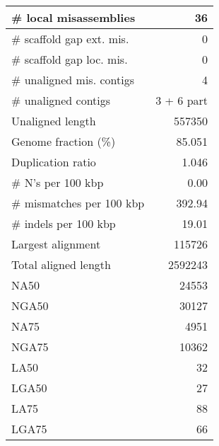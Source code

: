 \documentclass[12pt,a4paper]{article}
\begin{document}
\begin{table}[ht]
\begin{center}
\begin{tabular}{|l*{1}{|r}|}
\# local misassemblies & 36 \\ \hline
\# scaffold gap ext. mis. & 0 \\ \hline
\# scaffold gap loc. mis. & 0 \\ \hline
\# unaligned mis. contigs & 4 \\ \hline
\# unaligned contigs & 3 + 6 part \\ \hline
Unaligned length & 557350 \\ \hline
Genome fraction (\%) & 85.051 \\ \hline
Duplication ratio & 1.046 \\ \hline
\# N's per 100 kbp & 0.00 \\ \hline
\# mismatches per 100 kbp & 392.94 \\ \hline
\# indels per 100 kbp & 19.01 \\ \hline
Largest alignment & 115726 \\ \hline
Total aligned length & 2592243 \\ \hline
NA50 & 24553 \\ \hline
NGA50 & 30127 \\ \hline
NA75 & 4951 \\ \hline
NGA75 & 10362 \\ \hline
LA50 & 32 \\ \hline
LGA50 & 27 \\ \hline
LA75 & 88 \\ \hline
LGA75 & 66 \\ \hline
\end{tabular}
\end{center}
\end{table}
\end{document}
